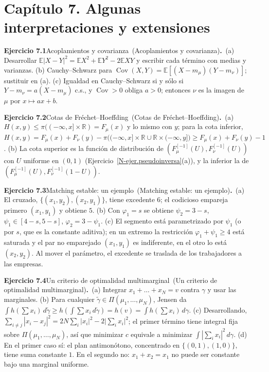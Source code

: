 \documentclass[11pt,a4paper]{amsart}
\newcommand{\R}{{\mathbb R}}
\newcommand{\E}{{\mathbb E}}
\theoremstyle{remark}
\theoremstyle{definition}
\numberwithin{subsection}{section}
\numberwithin{equation}{section}
\newcommand{\ejlabel}[2]{\par\medskip\noindent\textbf{Ejercicio #1}\ifx\relax#2\relax\else\ (#2)\fi\textbf{.}\ }
\begin{document}
\section*{Capítulo 7. Algunas interpretaciones y extensiones}
\ejlabel{7.1}{Acoplamientos y covarianza}(a) Desarrollar $\E|X-Y|^2=\E X^2+\E Y^2-2\E XY$ y escribir cada término con medias y varianzas. (b) Cauchy--Schwarz para $\operatorname{Cov}(X,Y)=\E[(X-m_\mu)(Y-m_\nu)]$; sustituir en (a). (c) Igualdad en Cauchy--Schwarz si y sólo si $Y-m_\nu=a(X-m_\mu)$ c.s., y $\operatorname{Cov}>0$ obliga $a>0$; entonces $\nu$ es la imagen de $\mu$ por $x\mapsto ax+b$.

\ejlabel{7.2}{Cotas de Fréchet--Hoeffding}(a) $H(x,y)\le\pi((-\infty,x]\times\R)=F_\mu(x)$ y lo mismo con $y$; para la cota inferior, $H(x,y)=F_\mu(x)+F_\nu(y)-\pi\bigl((-\infty,x]\times\R\cup\R\times(-\infty,y]\bigr)\ge F_\mu(x)+F_\nu(y)-1$. (b) La cota superior es la función de distribución de $(F_\mu^{[-1]}(U),F_\nu^{[-1]}(U))$ con $U$ uniforme en $(0,1)$ (Ejercicio~\ref{N-ejer.pseudoinversa}(a)), y la inferior la de $(F_\mu^{[-1]}(U),F_\nu^{[-1]}(1-U))$.

\ejlabel{7.3}{Matching estable: un ejemplo}(a) El cruzado, $\{(x_1,y_2),(x_2,y_1)\}$, tiene excedente $6$; el codicioso empareja primero $(x_1,y_1)$ y obtiene $5$. (b) Con $\varphi_1=s$ se obtiene $\psi_2=3-s$, $\psi_1\in[4-s,5-s]$, $\varphi_2=3-\psi_1$. (c) El segmento está parametrizado por $\psi_1$ (o por $s$, que es la constante aditiva); en un extremo la restricción $\varphi_1+\psi_1\ge4$ está saturada y el par no emparejado $(x_1,y_1)$ es indiferente, en el otro lo está $(x_2,y_2)$. Al mover el parámetro, el excedente se traslada de los trabajadores a las empresas.

\ejlabel{7.4}{Un criterio de optimalidad multimarginal}(a) Integrar $x_1+\dots+x_N=v$ contra $\gamma$ y usar las marginales. (b) Para cualquier $\tilde\gamma\in\Pi(\mu_1,\dots,\mu_N)$, Jensen da $\int h(\sum x_i)\,d\tilde\gamma\ge h(\int\sum x_i\,d\tilde\gamma)=h(v)=\int h(\sum x_i)\,d\gamma$. (c) Desarrollando, $\sum_{i\ne j}|x_i-x_j|^2=2N\sum_i|x_i|^2-2\bigl|\sum_ix_i\bigr|^2$; el primer término tiene integral fija sobre $\Pi(\mu_1,\dots,\mu_N)$, así que minimizar $c$ equivale a minimizar $\int|\sum_ix_i|^2\,d\gamma$. (d) En el primer caso sí: el plan antimonótono, concentrado en $\{(0,1),(1,0)\}$, tiene suma constante $1$. En el segundo no: $x_1+x_2=x_1$ no puede ser constante bajo una marginal uniforme.
\end{document}
